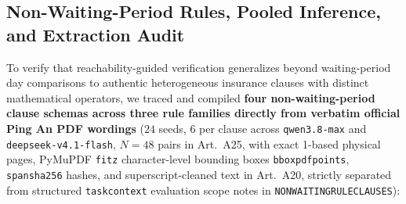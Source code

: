 \documentclass[10pt,twocolumn]{article}
\renewcommand{\_}{\textunderscore\allowbreak}
\begin{document}
\subsection{Non-Waiting-Period Rules, Pooled Inference, and Extraction Audit}
To verify that reachability-guided verification generalizes beyond waiting-period day comparisons to authentic heterogeneous insurance clauses with distinct mathematical operators, we traced and compiled \textbf{four non-waiting-period clause schemas across three rule families directly from verbatim official Ping An PDF wordings} ($24$ seeds, $6$ per clause across \texttt{qwen3.8-max} and \texttt{deepseek-v4.1-flash}, $N=48$ pairs in Art.~A25, with exact 1-based physical pages, PyMuPDF \texttt{fitz} character-level bounding boxes \texttt{bbox\_pdf\_points}, \texttt{span\_sha256} hashes, and superscript-cleaned text in Art.~A20, strictly separated from structured \texttt{task\_context} evaluation scope notes in \texttt{NON\_WAITING\_RULE\_CLAUSES}):
\end{document}
